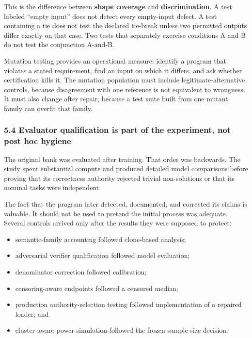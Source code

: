 \documentclass[
]{article}
\providecommand{\tightlist}{%
  \setlength{\itemsep}{0pt}\setlength{\parskip}{0pt}}
\begin{document}
This is the difference between \textbf{shape coverage} and
\textbf{discrimination}. A test labeled ``empty input'' does not detect
every empty-input defect. A test containing a tie does not test the
declared tie-break unless two permitted outputs differ exactly on that
case. Two tests that separately exercise conditions A and B do not test
the conjunction A-and-B.

Mutation testing provides an operational measure: identify a program
that violates a stated requirement, find an input on which it differs,
and ask whether certification kills it. The mutation population must
include legitimate-alternative controls, because disagreement with one
reference is not equivalent to wrongness. It must also change after
repair, because a test suite built from one mutant family can overfit
that family.

\subsubsection{5.4 Evaluator qualification is part of the experiment,
not post hoc
hygiene}\label{54-evaluator-qualification-is-part-of-the-experiment-not-post-hoc-hygiene}

The original bank was evaluated after training. That order was
backwards. The study spent substantial compute and produced detailed
model comparisons before proving that its correctness authority rejected
trivial non-solutions or that its nominal tasks were independent.

The fact that the program later detected, documented, and corrected its
claims is valuable. It should not be used to pretend the initial process
was adequate. Several controls arrived only after the results they were
supposed to protect:

\begin{itemize}
\tightlist
\item
  semantic-family accounting followed clone-based analysis;
\item
  adversarial verifier qualification followed model evaluation;
\item
  denominator correction followed calibration;
\item
  censoring-aware endpoints followed a censored median;
\item
  production authority-selection testing followed implementation of a
  repaired loader; and
\item
  cluster-aware power simulation followed the frozen sample-size
  decision.
\end{itemize}
\end{document}
